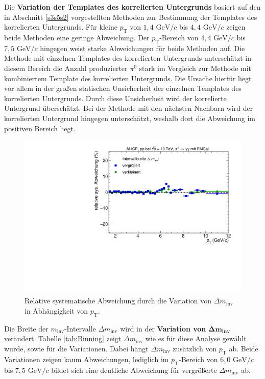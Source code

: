 \newline
Die \textbf{Variation der Templates des korrelierten Untergrunds} basiert auf den in Abschnitt \ref{s3s5s2} vorgestellten Methoden zur Bestimmung der Templates des korrelierten Untergrunds.
Für kleine $p_\text{T}$ von $1,4 \text{ GeV}/c$ bis $4,4 \text{ GeV}/c$ zeigen beide Methoden eine geringe Abweichung.
Der $p_\text{T}$-Bereich von $4,4 \text{ GeV}/c$ bis $7,5 \text{ GeV}/c$ hingegen weist starke Abweichungen für beide Methoden auf.
Die Methode mit einzelnen Templates des korrelierten Untergrunds unterschätzt in diesem Bereich die Anzahl produzierter $\pi^{0}$ stark im Vergleich zur Methode mit kombiniertem Template des korrelierten Untergrunds.
Die Ursache hierfür liegt vor allem in der großen statischen Unsicherheit der einzelnen Templates des korrelierten Untergrunds.
Durch diese Unsicherheit wird der korrelierte Untergrund überschätzt.
Bei der Methode mit den nächsten Nachbarn wird der korrelierten Untergrund hingegen unterschätzt, weshalb dort die Abweichung im positiven Bereich liegt.
\begin{figure}[t!]
\centering
\includegraphics[width=.65\linewidth]{YieldsSysUncerRebinning_Data_2016.pdf}
\caption{Relative systematische Abweichung durch die Variation von $\Delta m_\text{inv}$ in Abhängigkeit von $p_\text{T}$.}
\label{fig:BinningSys}
\end{figure}
\newline
Die Breite der $m_\text{inv}$-Intervalle $\Delta m_\text{inv}$ wird in der \textbf{Variation von} $\boldsymbol{\Delta m}_\textbf{inv}$ verändert.
Tabelle \ref{tab:Binning} zeigt $\Delta m_\text{inv}$ wie es für diese Analyse gewählt wurde, sowie für die Variationen.
Dabei hängt $\Delta m_\text{inv}$ zusätzlich von $p_\text{T}$ ab.
\newline
Beide Variationen zeigen kaum Abweichungen, lediglich im $p_\text{T}$-Bereich von $6,0 \text{ GeV}/c$ bis $7,5 \text{ GeV}/c$ bildet sich eine deutliche Abweichung für vergrößerte $\Delta m_\text{inv}$ ab.
